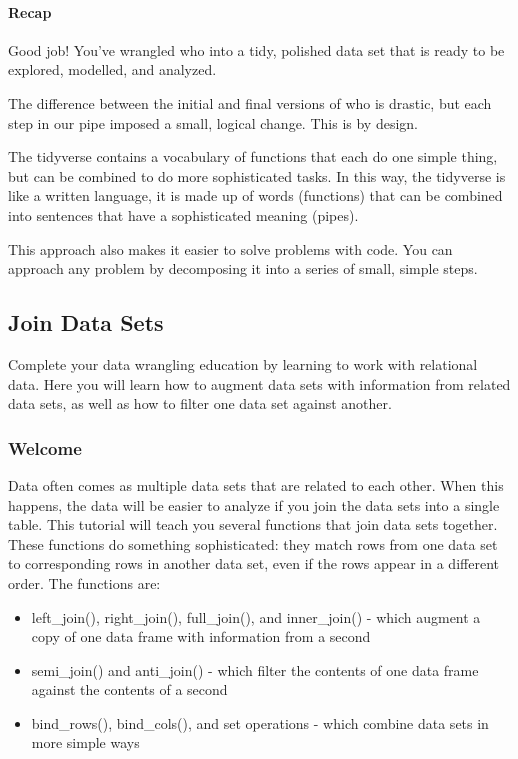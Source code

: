 \documentclass[
]{article}
\providecommand{\tightlist}{%
  \setlength{\itemsep}{0pt}\setlength{\parskip}{0pt}}
\begin{document}
\hypertarget{recap-11}{%
\paragraph{Recap}\label{recap-11}}

Good job! You've wrangled who into a tidy, polished data set that is
ready to be explored, modelled, and analyzed.

The difference between the initial and final versions of who is drastic,
but each step in our pipe imposed a small, logical change. This is by
design.

The tidyverse contains a vocabulary of functions that each do one simple
thing, but can be combined to do more sophisticated tasks. In this way,
the tidyverse is like a written language, it is made up of words
(functions) that can be combined into sentences that have a
sophisticated meaning (pipes).

This approach also makes it easier to solve problems with code. You can
approach any problem by decomposing it into a series of small, simple
steps.

\hypertarget{join-data-sets}{%
\subsection{Join Data Sets}\label{join-data-sets}}

Complete your data wrangling education by learning to work with
relational data. Here you will learn how to augment data sets with
information from related data sets, as well as how to filter one data
set against another.

\hypertarget{welcome-15}{%
\subsubsection{Welcome}\label{welcome-15}}

Data often comes as multiple data sets that are related to each other.
When this happens, the data will be easier to analyze if you join the
data sets into a single table. This tutorial will teach you several
functions that join data sets together. These functions do something
sophisticated: they match rows from one data set to corresponding rows
in another data set, even if the rows appear in a different order. The
functions are:

\begin{itemize}
\tightlist
\item
  left\_join(), right\_join(), full\_join(), and inner\_join() - which
  augment a copy of one data frame with information from a second
\item
  semi\_join() and anti\_join() - which filter the contents of one data
  frame against the contents of a second
\item
  bind\_rows(), bind\_cols(), and set operations - which combine data
  sets in more simple ways
\end{itemize}
\end{document}
